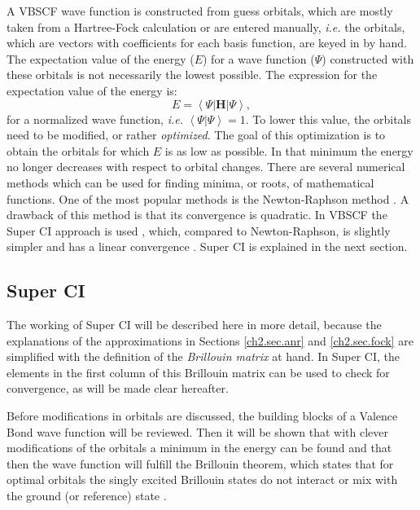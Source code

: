 A VBSCF wave function is constructed from guess orbitals, which are mostly taken from a Hartree-Fock calculation or are entered manually, \textit{i.e.} the orbitals, which are vectors with coefficients for each basis function, are keyed in by hand. The expectation value of the energy ($E$) for a wave function ($\Psi$) constructed with these orbitals is not necessarily the lowest possible. The expression for the expectation value of the energy is:
\begin{equation}
E = \left < \Psi | \mathbf{H} | \Psi \right >,
\label{ch2.eq.expenerg}
\end{equation}
for a normalized wave function, \textit{i.e.} $\left < \Psi | \Psi \right > = 1$. To lower this value, the orbitals need to be modified, or rather \textit{optimized}. The goal of this optimization is to obtain the orbitals for which $E$ is as low as possible. In that minimum the energy no longer decreases with respect to orbital changes. There are several numerical methods which can be used for finding minima, or roots, of mathematical functions. One of the most popular methods is the Newton-Raphson method \cite{zahid}. A drawback of this method is that its convergence is quadratic. In VBSCF the Super CI approach is used \cite{superci1,superci2}, which, compared to Newton-Raphson, is slightly simpler and has a linear convergence \cite{koos1}. Super CI is explained in the next section.

\subsection{Super CI}

The working of Super CI will be described here in more detail, because the explanations of the approximations in Sections \ref{ch2.sec.anr} and \ref{ch2.sec.fock} are simplified with the definition of the \textit{Brillouin matrix} at hand. In Super CI, the elements in the first column of this Brillouin matrix can be used to check for convergence, as will be made clear hereafter. 

Before modifications in orbitals are discussed, the building blocks of a Valence Bond wave function will be reviewed. Then it will be shown that with clever modifications of the orbitals a minimum in the energy can be found and that then the wave function will fulfill the Brillouin theorem, which states that for optimal orbitals the singly excited Brillouin states do not interact or mix with the ground (or reference) state \cite{brillouin}. 

